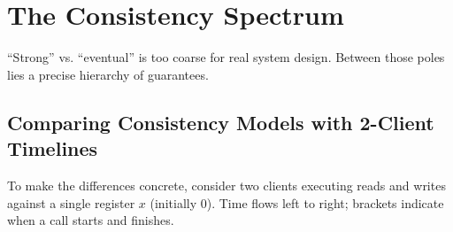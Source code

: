 \section{The Consistency Spectrum}

``Strong'' vs. ``eventual'' is too coarse for real system design. Between those poles lies a precise hierarchy of guarantees.

\subsection{Comparing Consistency Models with 2-Client Timelines}

To make the differences concrete, consider two clients executing reads and writes against a single register $x$ (initially $0$). Time flows left to right; brackets indicate when a call starts and finishes.

